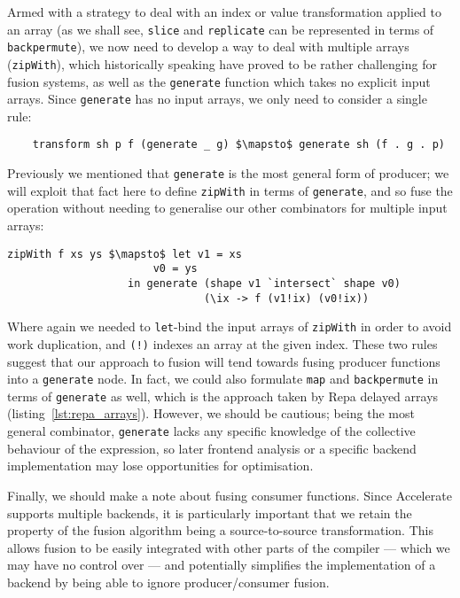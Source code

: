 Armed with a strategy to deal with an index or value transformation applied to
an array (as we shall see, \texttt{slice} and \texttt{replicate} can be
represented in terms of \texttt{backpermute}), we now need to develop a way to
deal with multiple arrays (\texttt{zipWith}), which historically speaking have
proved to be rather challenging for fusion systems, as well as the
\texttt{generate} function which takes no explicit input arrays. Since
\texttt{generate} has no input arrays, we only need to consider a single rule:
%
\begin{lstlisting}[style=haskell,numbers=none,mathescape]
%\bf$\langle$ RULE: generate/transform $\rangle$%
    transform sh p f (generate _ g) $\mapsto$ generate sh (f . g . p)
\end{lstlisting}
%
Previously we mentioned that \texttt{generate} is the most general form of
producer; we will exploit that fact here to define \texttt{zipWith} in
terms of \texttt{generate}, and so fuse the operation without needing to
generalise our other combinators for multiple input arrays:
%
\begin{lstlisting}[style=haskell,numbers=none,mathescape]
zipWith f xs ys $\mapsto$ let v1 = xs
                       v0 = ys
                   in generate (shape v1 `intersect` shape v0)
                               (\ix -> f (v1!ix) (v0!ix))
\end{lstlisting}
%
Where again we needed to \texttt{let}-bind the input arrays of \texttt{zipWith}
in order to avoid work duplication, and \texttt{(!)} indexes an array at the
given index. These two rules suggest that our approach to fusion will tend
towards fusing producer functions into a \texttt{generate} node. In fact, we
could also formulate \texttt{map} and \texttt{backpermute} in terms of
\texttt{generate} as well, which is the approach taken by Repa delayed arrays
(listing~\ref{lst:repa_arrays}). However, we should be cautious; being the most
general combinator, \texttt{generate} lacks any specific knowledge of the
collective behaviour of the expression, so later frontend analysis or a specific
backend implementation may lose opportunities for optimisation.

Finally, we should make a note about fusing consumer functions. Since Accelerate
supports multiple backends, it is particularly important that we retain the
property of the fusion algorithm being a source-to-source transformation. This
allows fusion to be easily integrated with other parts of the compiler --- which
we may have no control over --- and potentially simplifies the implementation of
a backend by being able to ignore producer/consumer fusion.


